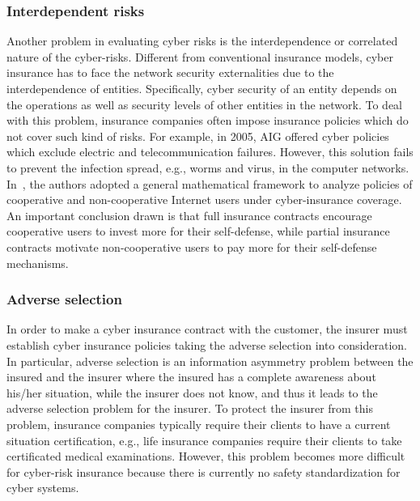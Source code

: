\documentclass[twocolumn,10pt]{IEEEtran}
\begin{document}
\subsubsection{Interdependent risks}

Another problem in evaluating cyber risks is the interdependence or correlated nature of the cyber-risks. Different from conventional insurance models, cyber insurance has to face the network security externalities due to the interdependence of entities. Specifically, cyber security of an entity depends on the operations as well as security levels of other entities in the network. To deal with this problem, insurance companies often impose insurance policies which do not cover such kind of risks. For example, in 2005, AIG offered cyber policies which exclude electric and telecommunication failures. However, this solution fails to prevent the infection spread, e.g., worms and virus, in the computer networks. In~\cite{Pal2010Analyzing}, the authors adopted a general mathematical framework to analyze policies of cooperative and non-cooperative Internet users under cyber-insurance coverage. An important conclusion drawn is that full insurance contracts encourage cooperative users to invest more for their self-defense, while partial insurance contracts motivate non-cooperative users to pay more for their self-defense mechanisms. 



\subsubsection{Adverse selection}

In order to make a cyber insurance contract with the customer, the insurer must establish cyber insurance policies taking the adverse selection into consideration. In particular, adverse selection is an information asymmetry problem between the insured and the insurer where the insured has a complete awareness about his/her situation, while the insurer does not know, and thus it leads to the adverse selection problem for the insurer. To protect the insurer from this problem, insurance companies typically require their clients to have a current situation certification, e.g., life insurance companies require their clients to take certificated medical examinations. However, this problem becomes more difficult for cyber-risk insurance because there is currently no safety standardization for cyber systems. 
\end{document}
